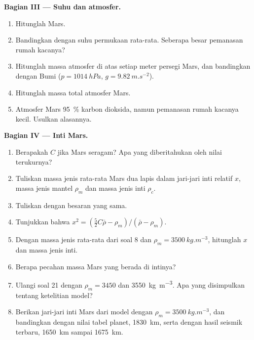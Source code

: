 \begin{problem}
\medskip
\noindent\textbf{Bagian III --- Suhu dan atmosfer.}
\begin{enumerate}[resume]
  \item Hitunglah  Mars.
  \item Bandingkan dengan suhu permukaan rata-rata. Seberapa besar pemanasan rumah kacanya?
  \item Hitunglah massa atmosfer di atas setiap meter persegi Mars, dan bandingkan dengan Bumi ($p = \qty{1014}{hPa}$, $g = \qty{9.82}{m.s^{-2}}$).
  \item Hitunglah massa total atmosfer Mars.
  \item Atmosfer Mars \qty{95}{\percent} karbon dioksida, namun pemanasan rumah kacanya kecil. Usulkan alasannya.
\end{enumerate}

\medskip
\noindent\textbf{Bagian IV --- Inti Mars.}
\begin{enumerate}[resume]
  \item Berapakah $C$ jika Mars seragam? Apa yang diberitahukan oleh nilai terukurnya?
  \item Tuliskan massa jenis rata-rata Mars dua lapis dalam jari-jari inti relatif $x$, massa jenis mantel $\rho_m$ dan massa jenis inti $\rho_c$.
  \item Tuliskan  dengan besaran yang sama.
  \item Tunjukkan bahwa $x^2 = (\tfrac52C\bar\rho - \rho_m)/(\bar\rho - \rho_m)$.
  \item Dengan massa jenis rata-rata dari soal 8 dan $\rho_m =
        \qty{3500}{kg.m^{-3}}$, hitunglah $x$ dan massa jenis inti.
  \item Berapa pecahan massa Mars yang berada di intinya?
  \item Ulangi soal 21 dengan $\rho_m = 3450$ dan \qty{3550}{kg.m^{-3}}. Apa yang disimpulkan tentang ketelitian model?
  \item Berikan jari-jari inti Mars dari model dengan $\rho_m = \qty{3500}{kg.m^{-3}}$, dan bandingkan dengan nilai tabel planet, \qty{1830}{km}, serta dengan hasil seismik terbaru, \qty{1650}{km} sampai \qty{1675}{km}.
\end{enumerate}
\end{problem}
